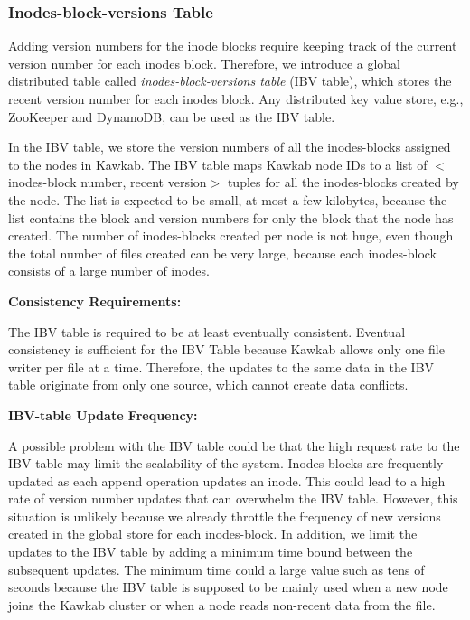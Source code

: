 \documentclass[]{article}
\newcommand{\subtopic}[1]{\vspace{1.5pt} \noindent \textbf{#1}}
\begin{document}
\subsubsection{Inodes-block-versions Table}

Adding version numbers for the inode blocks require keeping track of the
current version number for each inodes block. Therefore, we introduce a global
distributed table called \textit{inodes-block-versions table} (IBV table),
which  stores the recent version number for each inodes block. Any distributed
key value store, e.g., ZooKeeper and DynamoDB, can be used as the IBV table. 

In the IBV table, we store the version numbers of all the inodes-blocks
assigned to the nodes in Kawkab. The IBV table maps Kawkab node IDs to a list
of $<$inodes-block number, recent version$>$ tuples for all the inodes-blocks
created by the node. The list is expected to be small, at most a few kilobytes, 
because the list
contains the block and version numbers for only the block that the node
has created.  The number of inodes-blocks created per node is not huge, 
even though the total number of files created can be very large,
because each inodes-block consists of a large number of inodes. 

\subtopic{Consistency Requirements:}

The IBV table is required to be at least eventually consistent.  Eventual
consistency is sufficient for the IBV Table because Kawkab allows only one file
writer per file at a time.
Therefore, the updates to the same data in the IBV table originate from only
one source, which cannot create data conflicts.

\subtopic{IBV-table Update Frequency:}

A possible problem with the IBV table could be that the high request rate to
the IBV table may limit the scalability of the system. Inodes-blocks are
frequently updated as each append operation updates an inode. This could lead
to a high rate of version number updates that can overwhelm the IBV table.
However, this situation is unlikely because we already throttle the frequency
of new versions created in the global store for each inodes-block.  In
addition, we limit the updates to the IBV table by adding a minimum time bound
between the subsequent updates. The minimum time
could a large value such as tens of seconds because the IBV table is 
supposed to be mainly used when a new node joins the Kawkab cluster or when a node
reads non-recent data from the file.
\end{document}
